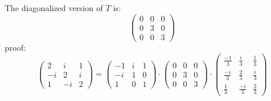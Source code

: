 \documentclass{article}
\begin{document}
The diagonalized version of \(T\) is:
\begin{equation*}
    \begin{pmatrix}
        0 & 0 & 0 \\
        0 & 3 & 0 \\
        0 & 0 & 3
    \end{pmatrix}
\end{equation*}
proof:
\begin{equation*}
    \begin{pmatrix}
        2  & i & 1 \\
        -i & 2 & i \\
        1  & -i & 2
    \end{pmatrix}
    = 
    \begin{pmatrix}
        -1 & i & 1 \\
        -i & 1 & 0 \\
        1 & 0 & 1
    \end{pmatrix}
    \cdot
    \begin{pmatrix}
        0 & 0 & 0 \\
        0 & 3 & 0 \\
        0 & 0 & 3
    \end{pmatrix}
    \cdot
    \begin{pmatrix}
        \frac{-1}{3} & \frac{i}{3} & \frac{1}{3} \\
        \frac{-i}{3} & \frac{2}{3} & \frac{i}{3} \\
        \frac{1}{3} & \frac{-i}{3} & \frac{2}{3} 
    \end{pmatrix}
\end{equation*}
\end{document}
